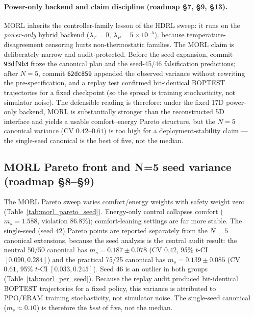 \documentclass[11pt,a4paper]{article}
\begin{document}
\paragraph{Power-only backend and claim discipline (roadmap \S7, \S9, \S13).} MORL inherits the controller-family lesson of the HDRL sweep: it runs on the \emph{power-only} hybrid backend ($\lambda_T=0$, $\lambda_P=5\times10^{-5}$), because temperature-disagreement censoring hurts non-thermostatic families. The MORL claim is deliberately narrow and audit-protected. Before the seed expansion, commit \texttt{93df9b3} froze the canonical plan and the seed-45/46 falsification predictions; after $N=5$, commit \texttt{62dc859} appended the observed variance without rewriting the pre-specification, and a replay test confirmed bit-identical BOPTEST trajectories for a fixed checkpoint (so the spread is training stochasticity, not simulator noise). The defensible reading is therefore: under the fixed 17D power-only backend, MORL is substantially stronger than the reconstructed 5D interface and yields a usable comfort--energy Pareto structure, but the $N=5$ canonical variance (CV $0.42$--$0.61$) is too high for a deployment-stability claim --- the single-seed canonical is the best of five, not the median.

\subsection{MORL Pareto front and N=5 seed variance (roadmap \S8--\S9)}

The MORL Pareto sweep varies comfort/energy weights with safety weight zero (Table~\ref{tab:morl_pareto_seed}). Energy-only control collapses comfort ($m_s=1.588$, violation $86.8\%$); comfort-leaning settings are far more stable. The single-seed (seed 42) Pareto points are reported separately from the $N=5$ canonical extensions, because the seed analysis is the central audit result: the neutral 50/50 canonical has $m_s=0.187\pm0.078$ (CV $0.42$, 95\% $t$-CI $[0.090,0.284]$) and the practical 75/25 canonical has $m_s=0.139\pm0.085$ (CV $0.61$, 95\% $t$-CI $[0.033,0.245]$). Seed 46 is an outlier in both groups (Table~\ref{tab:morl_per_seed}). Because the replay audit produced bit-identical BOPTEST trajectories for a fixed policy, this variance is attributed to PPO/ERAM training stochasticity, not simulator noise. The single-seed canonical ($m_s\approx0.10$) is therefore the \emph{best} of five, not the median.
\end{document}

